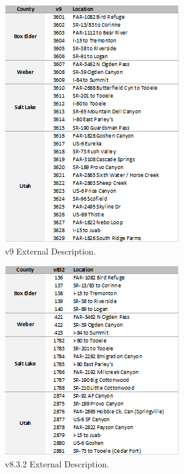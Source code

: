 \documentclass[
  letterpaper,
  DIV=11,
  numbers=noendperiod,
  titlepage=false]{scrreprt}
\begin{document}
\begin{figure}[H]

{\centering \includegraphics{v9x/v900/whats-new/_pictures/ex_descrip1.png}

}

\caption{\label{fig-descrip1}v9 External Description.}

\end{figure}

\begin{figure}[H]

{\centering \includegraphics{v9x/v900/whats-new/_pictures/ex_descrip2.png}

}

\caption{\label{fig-descrip2}v8.3.2 External Description.}

\end{figure}
\end{document}
